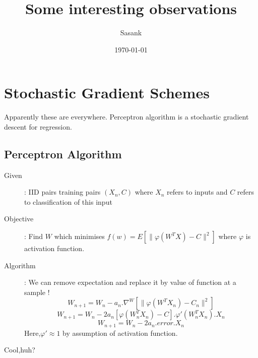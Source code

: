\documentclass[a4paper]{article}
\begin{document}
\title{Some interesting observations}
\author{Sasank}
\date{\today}
\maketitle

\section{Stochastic Gradient Schemes}
Apparently these are everywhere. Perceptron algorithm is a stochastic gradient descent for regression.

\subsection{Perceptron Algorithm}
\begin{description}
\item[Given]: IID pairs training pairs $(X_n,C)$ where $X_n$ refers to inputs and $C$ refers to classification of this input
\item[Objective]: Find $W$ which minimises $f(w) = E\left [\| \varphi\left (W^TX\right)-C \|^2 \right ]$ where $\varphi$ is activation function.

\item[Algorithm]: We can remove expectation and replace it by value of function at a sample !
$$W_{n+1} = W_n -a_n. \nabla^W \left[ \|\varphi\left (W^TX_n\right)-C_n \|^2 \right ]$$
$$W_{n+1} = W_n -2a_n\left [ \varphi\left(W_n^TX_n\right )-C \right ] .\varphi'\left(W_n^TX_n\right ).X_n$$
$$W_{n+1} = W_n -2a_n.error.X_n$$
Here,$\varphi' \approx 1$ by assumption of activation function. 
\end{description}
Cool,huh?
\end{document}
